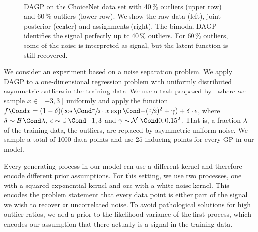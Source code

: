 \begin{figure}[t]
    \centering
    \hspace{-7pt}%
    \hspace{-7pt}%
    \\%
    \vspace{\figureskip}%
    \hspace{-7pt}%
    \hspace{-7pt}%
    \caption{
        \label{fig:data_association:choicenet}
        DAGP on the ChoiceNet data set with 40\,\% outliers (upper row) and 60\,\% outliers (lower row).
        We show the raw data (left), joint posterior (center) and assignments (right).
        The bimodal DAGP identifies the signal perfectly up to 40\,\% outliers.
        For 60\,\% outliers, some of the noise is interpreted as signal, but the latent function is still recovered.
    }
\end{figure}
%
We consider an experiment based on a noise separation problem.
We apply DAGP to a one-dimensional regression problem with uniformly distributed asymmetric outliers in the training data.
We use a task proposed by~\textcite{choi_choicenet_2018} where we sample $x \in [-3, 3]$ uniformly and apply the function $\Fun{f}{x} = (1 - \delta)(\Fun{\cos}{\sfrac{\pi}{2} \cdot x}\Fun{\exp}{-(\sfrac{x}{2})^2} + \gamma) + \delta \cdot \epsilon$, where $\delta \sim \Fun{\Ber}{\lambda}$, $\epsilon \sim \Fun{\Uni}{-1, 3}$ and $\gamma \sim \Gaussian{0, 0.15^2}$.
That is, a fraction $\lambda$ of the training data, the outliers, are replaced by asymmetric uniform noise.
We sample a total of 1000 data points and use $25$ inducing points for every GP in our model.

Every generating process in our model can use a different kernel and therefore encode different prior assumptions.
For this setting, we use two processes, one with a squared exponential kernel and one with a white noise kernel.
This encodes the problem statement that every data point is either part of the signal we wish to recover or uncorrelated noise.
To avoid pathological solutions for high outlier ratios, we add a prior to the likelihood variance of the first process, which encodes our assumption that there actually is a signal in the training data.


